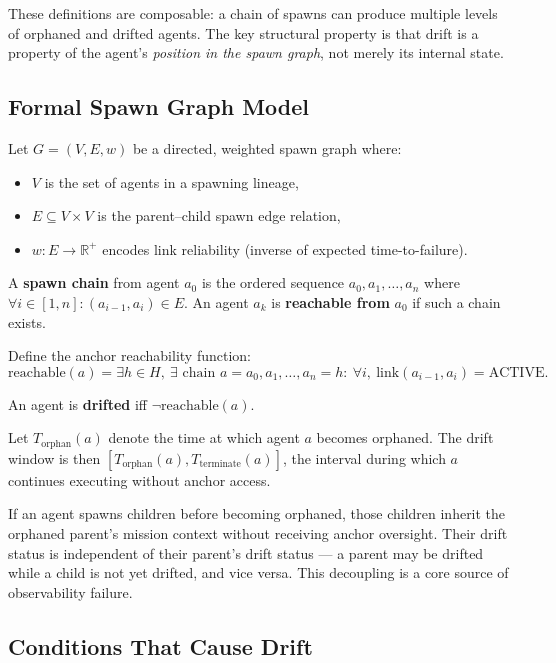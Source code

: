These definitions are composable: a chain of spawns can produce multiple levels of orphaned and drifted agents. The key structural property is that drift is a property of the agent's \emph{position in the spawn graph}, not merely its internal state.

\subsection{Formal Spawn Graph Model}

Let $G = (V, E, w)$ be a directed, weighted spawn graph where:
\begin{itemize}
    \item $V$ is the set of agents in a spawning lineage,
    \item $E \subseteq V \times V$ is the parent--child spawn edge relation,
    \item $w: E \to \mathbb{R}^+$ encodes link reliability (inverse of expected time-to-failure).
\end{itemize}

A \textbf{spawn chain} from agent $a_0$ is the ordered sequence $a_0, a_1, \ldots, a_n$ where $\forall i \in [1,n]: (a_{i-1}, a_i) \in E$. An agent $a_k$ is \textbf{reachable from} $a_0$ if such a chain exists.

Define the anchor reachability function:
\[
\text{reachable}(a) = \exists h \in H,\ \exists \text{ chain } a = a_0, a_1, \ldots, a_n = h:\ \forall i,\ \text{link}(a_{i-1}, a_i) = \text{ACTIVE}.
\]

An agent is \textbf{drifted} iff $\neg \text{reachable}(a)$.

Let $T_{\text{orphan}}(a)$ denote the time at which agent $a$ becomes orphaned. The drift window is then $[T_{\text{orphan}}(a), T_{\text{terminate}}(a)]$, the interval during which $a$ continues executing without anchor access.

\begin{observation}
If an agent spawns children before becoming orphaned, those children inherit the orphaned parent's mission context without receiving anchor oversight. Their drift status is independent of their parent's drift status — a parent may be drifted while a child is not yet drifted, and vice versa. This decoupling is a core source of observability failure.
\end{observation}

\subsection{Conditions That Cause Drift}

